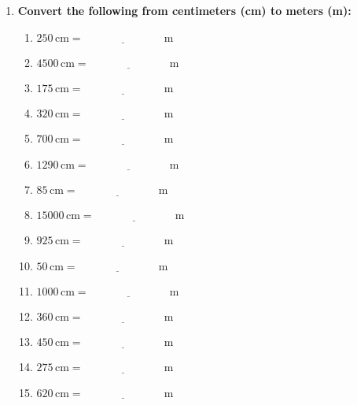 \documentclass[12pt]{article}
\begin{document}
\begin{enumerate}
    \item \textbf{Convert the following from centimeters (cm) to meters (m):}
    \begin{multicols}{2}
    \begin{enumerate}
        \item \(250 \, \text{cm} = \underline{\hspace{3cm}} \, \text{m}\)
        \item \(4500 \, \text{cm} = \underline{\hspace{3cm}} \, \text{m}\)
        \item \(175 \, \text{cm} = \underline{\hspace{3cm}} \, \text{m}\)
        \item \(320 \, \text{cm} = \underline{\hspace{3cm}} \, \text{m}\)
        \item \(700 \, \text{cm} = \underline{\hspace{3cm}} \, \text{m}\)
        \item \(1290 \, \text{cm} = \underline{\hspace{3cm}} \, \text{m}\)
        \item \(85 \, \text{cm} = \underline{\hspace{3cm}} \, \text{m}\)
        \item \(15000 \, \text{cm} = \underline{\hspace{3cm}} \, \text{m}\)
        \item \(925 \, \text{cm} = \underline{\hspace{3cm}} \, \text{m}\)
        \item \(50 \, \text{cm} = \underline{\hspace{3cm}} \, \text{m}\)
        \item \(1000 \, \text{cm} = \underline{\hspace{3cm}} \, \text{m}\)
        \item \(360 \, \text{cm} = \underline{\hspace{3cm}} \, \text{m}\)
        \item \(450 \, \text{cm} = \underline{\hspace{3cm}} \, \text{m}\)
        \item \(275 \, \text{cm} = \underline{\hspace{3cm}} \, \text{m}\)
        \item \(620 \, \text{cm} = \underline{\hspace{3cm}} \, \text{m}\)
    \end{enumerate}
    \end{multicols}


\end{enumerate}
\end{document}
